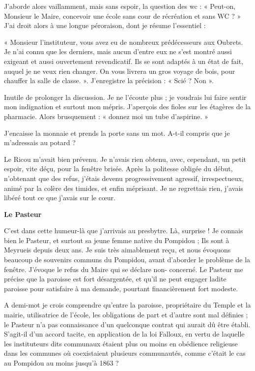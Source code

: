 J’aborde alors vaillamment, mais sans espoir, la question des wc :
« Peut-on, Monsieur le Maire, concevoir une école sans cour de récréation et sans
WC ? »
J’ai droit alors à une longue péroraison, dont je résume l’essentiel :

« Monsieur l’instituteur, vous avez eu de nombreux prédécesseurs aux Oubrets. Je
n’ai connu que les derniers, mais aucun d’entre eux ne s’est montré aussi exigeant et
aussi ouvertement revendicatif. Ils se sont adaptés à un état de fait, auquel je ne veux
rien changer.
On vous livrera un gros voyage de bois, pour chauffer la salle de classe. ».
J’enregistre la précision : « Scié ? Non ».

Inutile de prolonger la discussion. Je ne l’écoute plus ; je voudrais lui faire sentir mon
indignation et surtout mon mépris. J’aperçois des fioles sur les étagères de la
pharmacie. Alors brusquement :
« donnez moi un tube d’aspirine. »


J’encaisse la monnaie et prends la porte sans un mot. A-t-il compris que je m’adressais au
potard ?

Le Ricou m’avait bien prévenu. Je n’avais rien obtenu, avec, cependant, un petit espoir, vite
déçu, pour la fenêtre brisée. Après la politesse obligée du début, n’obtenant que des refus,
j’étais devenu progressivement agressif, irrespectueux, animé par la colère des timides, et
enfin méprisant. Je ne regrettais rien, j’avais libéré tout ce que j’avais sur le cœur.

\textbf{Le Pasteur}

C’est dans cette humeur-là que j’arrivais au presbytre. Là, surprise ! Je connais bien le Pasteur,
et surtout sa jeune femme native du Pompidou ; Ils sont à Meyrueis depuis deux ans. Je suis
très aimablement reçu, et nous évoquons beaucoup de souvenirs communs du Pompidou,
avant d’aborder le problème de la fenêtre. J’évoque le refus du Maire qui se déclare non-
concerné. Le Pasteur me précise que la paroisse est fort désargentée, et qu’il ne peut engager
ladite paroisse pour satisfaire à ma demande, pourtant financièrement fort modeste.

A demi-mot je crois comprendre qu’entre la paroisse, propriétaire du Temple et la mairie,
utilisatrice de l’école, les obligations de part et d’autre sont mal définies ; le Pasteur n’a pas
connaissance d’un quelconque contrat qui aurait dû être établi. S’agit-il d’un accord tacite, en
application de la loi Falloux, en vertu de laquelle les instituteurs dits communaux étaient plus
ou moins en obédience religieuse dans les communes où coexistaient plusieurs communautés,
comme c’était le cas au Pompidou au moins jusqu’à 1863 ?

